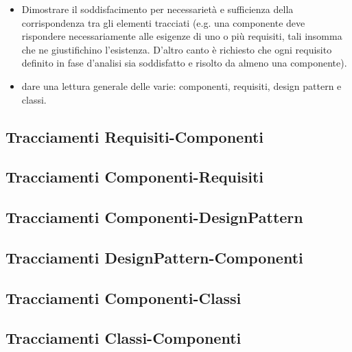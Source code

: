 \begin{itemize}
	\item Dimostrare il soddisfacimento per necessarietà e sufficienza della corrispondenza tra gli elementi tracciati (e.g. una componente deve rispondere necessariamente alle esigenze di uno o più requisiti, tali insomma che ne giustifichino l'esistenza. D'altro canto è richiesto che ogni requisito definito in fase d'analisi sia soddisfatto e risolto da almeno una componente).
	\item dare una lettura generale delle varie: componenti, requisiti, design pattern e classi.
\end{itemize}

\subsection{Tracciamenti Requisiti-Componenti}

\subsection{Tracciamenti Componenti-Requisiti}

\subsection{Tracciamenti Componenti-DesignPattern}

\subsection{Tracciamenti DesignPattern-Componenti}

\subsection{Tracciamenti Componenti-Classi}

\subsection{Tracciamenti Classi-Componenti}

